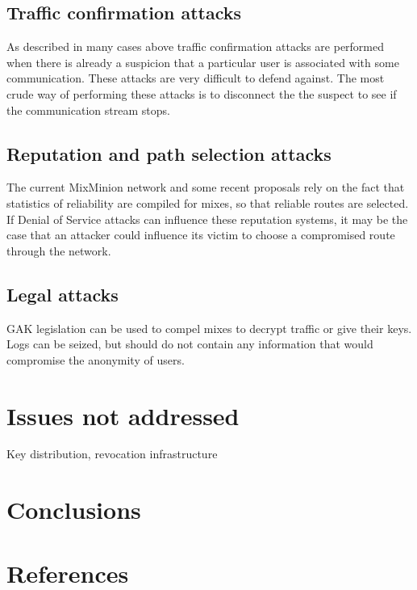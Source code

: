 \documentclass{article}
\begin{document}
\subsection{Traffic confirmation attacks}

As described in many cases above traffic confirmation attacks are
performed when there is already a suspicion that a particular user is
associated with some communication. These attacks are very difficult
to defend against. The most crude way of performing these attacks is
to disconnect the the suspect to see if the communication stream stops.

\subsection{Reputation and path selection attacks}

The current MixMinion network and some recent proposals rely on the
fact that statistics of reliability are compiled for mixes, so that
reliable routes are selected. If Denial of Service attacks can
influence these reputation systems, it may be the case that an
attacker could influence its victim to choose a compromised route
through the network.

\subsection{Legal attacks}

GAK legislation can be used to compel mixes to decrypt traffic or give
their keys. Logs can be seized, but should do not contain any
information that would compromise the anonymity of users.

\section{Issues not addressed}

Key distribution, revocation infrastructure

\section{Conclusions}
\section{References}
\end{document}
